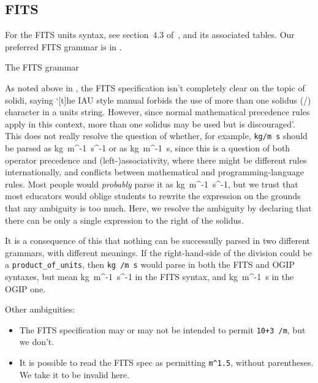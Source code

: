 \documentclass[11pt,notitlepage,onecolumn]{ivoa}
\makeatletter
\def\units{\@ifstar{\let\un@tsspace\relax    \un@ts}%
                   {\let\un@tsspace\thinspace\un@ts}}
\newcommand{\un@ts}[1]{{\let~\thinspace
  \ifmmode
    \un@tsspace\mathrm{#1}%
  \else
    \nobreak$\un@tsspace\mathrm{#1}$%
  \fi}}
\makeatother
\begin{document}
\subsection{FITS}
\label{appx:fitsgrammar}

For the FITS units syntax, see section~4.3 of~\cite{pence10}, and its
associated tables.  Our preferred FITS grammar is in
.

\begin{table}

\caption{\label{tabx:fitsgrammar}The FITS grammar}
\end{table}

As noted above in , 
the FITS specification isn't completely clear on the topic of 
solidi, saying `[t]he IAU style manual forbids
the use of more than one solidus (/) character in a units
string. However, since normal mathematical precedence rules apply
in this context, more than one solidus may be used but is
discouraged'.  This does not really resolve the question of whether, for
example, \texttt{kg/m s} should be parsed as \units{kg~m^{-1}~s^{-1}}
or as \units{kg~m^{-1}~s}, since this is a question of both operator
precedence and (left-)associativity, where there might be different
rules internationally, and conflicts between mathematical and
programming-language rules.  Most people would \emph{probably} parse
it as \units{kg~m^{-1}~s^{-1}}, but we trust that most educators would
oblige students to rewrite the expression on the grounds that any
ambiguity is too much.
Here, we resolve the ambiguity by declaring that there can
be only a single expression to the right of the solidus.

It is a consequence of this that nothing can be
successully parsed in two different grammars, with different
meanings.  If the right-hand-side of the division could be a
\texttt{product\_of\_units}, then \texttt{kg /m s} would parse in both
the FITS and OGIP syntaxes,
but mean \units{kg~m^{-1}~s^{-1}} in the FITS syntax, and
\units{kg~m^{-1}~s} in the OGIP one.

Other ambiguities:
\begin{itemize}
\item The FITS specification may or may not be intended to permit 
  \texttt{10+3 /m}, but we don't.
\item It is possible to read the FITS spec as permitting
  \texttt{m\^{}1.5}, without parentheses.  We take it to be
  invalid here.
\end{itemize}
\end{document}
